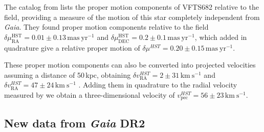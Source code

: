 \documentclass[apjl,twocolumn]{emulateapj}
\newcommand{\kms}{{\,\mathrm{km\ s^{-1}}}}
\begin{document}
The catalog from \citet{platais:18} lists the proper motion
components of VFTS682 relative to the field, providing a
measure of the motion of this star completely independent from
\emph{Gaia}. They found proper
motion components relative to the field
$\delta\mu_\mathrm{RA}^\mathrm{HST} = 0.01\pm0.13\,\mathrm{mas\
  yr^{-1}}$ and
$\delta\mu_\mathrm{DEC}^\mathrm{HST}=0.2\pm0.1\,\mathrm{mas\
  yr^{-1}}$, which added in quadrature give a relative proper motion of
$\delta \mu^{HST} =0.20 \pm 0.15\,\mathrm{mas\ yr^{-1}}$.

These proper motion components can also be converted into projected
velocities assuming a distance of 50\,kpc, obtaining $\delta
v_\mathrm{RA}^{HST}=2\pm31\kms$ and $\delta
v_\mathrm{RA}^{HST}=47\pm24\kms$%
.
Adding them in quadrature to the radial velocity
measured by \citet{bestenlehner:11} we obtain a three-dimensional velocity of
$v_\mathrm{pec}^{HST}=56 \pm 23  \kms$.


\subsection{New data from \emph{Gaia} DR2  \label{data:gaia}}
\end{document}

